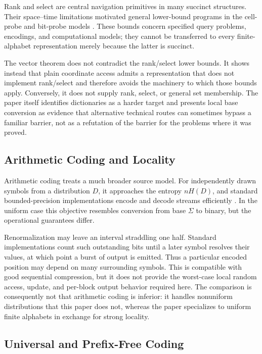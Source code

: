 Rank and select are central navigation primitives in many succinct
structures.  Their space--time limitations motivated general lower-bound
programs in the cell-probe and bit-probe models
\cite{gal2003cell,golynski2009cell,patrascu2010cell,viola2009bit}.  These
bounds concern specified query problems, encodings, and computational models;
they cannot be transferred to every finite-alphabet representation merely
because the latter is succinct.

The vector theorem does not contradict the rank/select lower bounds.  It
shows instead that plain coordinate access admits a representation that does
not implement rank/select and therefore avoids the machinery to which those
bounds apply.  Conversely, it does not supply rank, select, or general set
membership.  The paper itself identifies dictionaries as a harder target and
presents local base conversion as evidence that alternative technical routes
can sometimes bypass a familiar barrier, not as a refutation of the barrier
for the problems where it was proved.

\subsection{Arithmetic Coding and Locality}

Arithmetic coding treats a much broader source model.  For independently
drawn symbols from a distribution \(D\), it approaches the entropy
\(nH(D)\), and standard bounded-precision implementations encode and decode
streams efficiently \cite{witten1987arithmetic,moffat1998arithmetic}.  In the
uniform case this objective resembles conversion from base \(\Sigma\) to
binary, but the operational guarantees differ.

Renormalization may leave an interval straddling one half.  Standard
implementations count such outstanding bits until a later symbol resolves
their values, at which point a burst of output is emitted.  Thus a particular
encoded position may depend on many surrounding symbols.  This is compatible
with good sequential compression, but it does not provide the worst-case
local random access, update, and per-block output behavior required here.
The comparison is consequently not that arithmetic coding is inferior: it
handles nonuniform distributions that this paper does not, whereas the paper
specializes to uniform finite alphabets in exchange for strong locality.

\subsection{Universal and Prefix-Free Coding}

